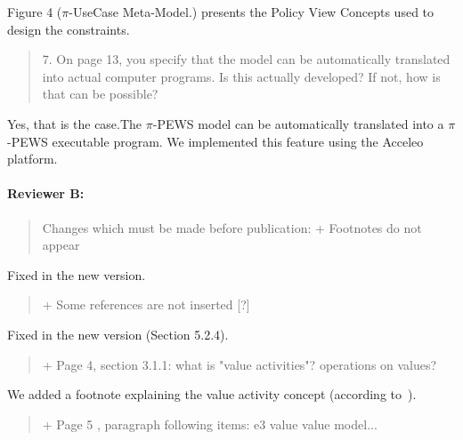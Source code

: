 \documentclass[12pt,a4wide]{article}
\begin{document}
Figure 4 ($\pi$-UseCase Meta-Model.) presents the Policy View Concepts used to design the constraints.

\begin{quotation}\sf\footnotesize

7.    On page 13, you specify that the model can be automatically translated into actual computer programs. Is this actually developed? If not, how is that can be possible? 
\end{quotation}
 
\noindent 
 
 
Yes, that is the case.The $\pi$-PEWS model can be automatically translated into a $\pi$-PEWS executable program. We implemented this feature using the Acceleo platform.
 
\paragraph*{Reviewer B:} 
\begin{quotation}\sf\footnotesize

Changes which must be made before publication: 
+ Footnotes do not appear 
\end{quotation}

\noindent 
Fixed in the new version.


\begin{quotation}\sf\footnotesize

+ Some references are not inserted [?] 
\end{quotation}

\noindent 
Fixed in the new version (Section 5.2.4).

\begin{quotation}\sf\footnotesize

+ Page 4, section 3.1.1: what is "value activities"? operations on values? 
\end{quotation}

\noindent 
We added a footnote explaining the value activity concept (according to~\cite{Gordijn02valuebased}).

\begin{quotation}\sf\footnotesize

+ Page 5 , paragraph following items: e3 value value model... 
\end{quotation}
\end{document}
